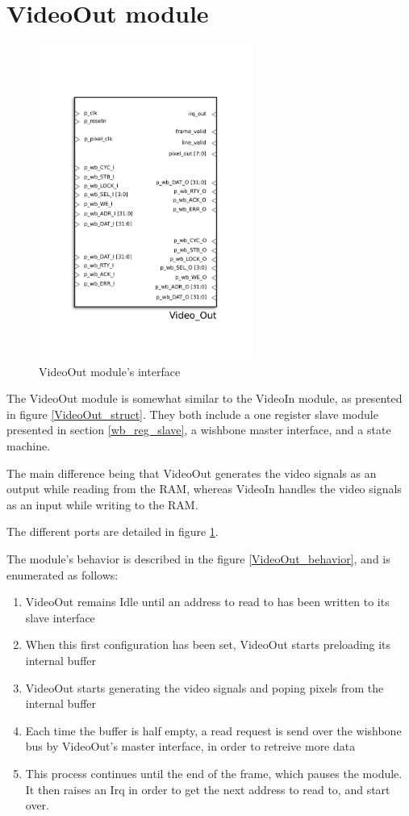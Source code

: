 
\section{VideoOut module}

\begin{figure}[H]
\center
\includegraphics[width=7cm]{figs/Video_out.pdf}
\caption{VideoOut module's interface}
\label{VideoOut_interface}
\end{figure}

The VideoOut module is somewhat similar to the VideoIn module, as presented in figure \ref{VideoOut_struct}. They both include a one register slave module presented in section \ref{wb_reg_slave}, a wishbone master interface, and a state machine.


The main difference being that VideoOut generates the video signals as an output while reading from the RAM, whereas VideoIn handles the video signals as an input while writing to the RAM.

The different ports are detailed in figure \ref{VideoOut_interface}.

The module's behavior is described in the figure \ref{VideoOut_behavior}, and is enumerated as follows:
\begin{enumerate}
\item VideoOut remains Idle until an address to read to has been written to its slave interface
\item When this first configuration has been set, VideoOut starts preloading its internal buffer
\item VideoOut starts generating the video signals and poping pixels from the internal buffer
\item Each time the buffer is half empty, a read request is send over the wishbone bus by VideoOut's master interface, in order to retreive more data
\item This process continues until the end of the frame, which pauses the module. It then raises an Irq in order to get the next address to read to, and start over.
\end{enumerate}

